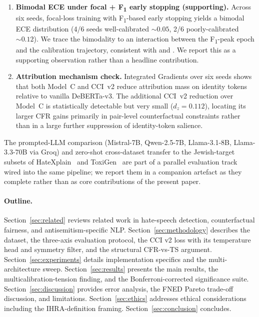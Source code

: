 \begin{enumerate}[leftmargin=*,itemsep=2pt]
    \item \textbf{Bimodal ECE under focal + F\textsubscript{1} early stopping (supporting).} Across six seeds, focal-loss training with F\textsubscript{1}-based early stopping yields a bimodal ECE distribution (4/6 seeds well-calibrated $\sim 0.05$, 2/6 poorly-calibrated $\sim 0.12$). We trace the bimodality to an interaction between the F\textsubscript{1}-peak epoch and the calibration trajectory, consistent with \citet{mukhoti2020calibrating} and \citet{tao2023pcs}. We report this as a supporting observation rather than a headline contribution.
    \item \textbf{Attribution mechanism check.} Integrated Gradients over six seeds shows that both Model~C and CCI~v2 reduce attribution mass on identity tokens relative to vanilla DeBERTa-v3. The additional CCI~v2 reduction over Model~C is statistically detectable but very small ($d_z=0.112$), locating its larger CFR gains primarily in pair-level counterfactual constraints rather than in a large further suppression of identity-token salience.
\end{enumerate}

The prompted-LLM comparison (Mistral-7B, Qwen-2.5-7B, Llama-3.1-8B, Llama-3.3-70B via Groq) and zero-shot cross-dataset transfer to the Jewish-target subsets of HateXplain~\citep{mathew2021hatexplain} and ToxiGen~\citep{hartvigsen2022toxigen} are part of a parallel evaluation track wired into the same pipeline; we report them in a companion artefact as they complete rather than as core contributions of the present paper.

\paragraph{Outline.}
Section~\ref{sec:related} reviews related work in hate-speech detection, counterfactual fairness, and antisemitism-specific NLP. Section~\ref{sec:methodology} describes the dataset, the three-axis evaluation protocol, the CCI v2 loss with its temperature head and symmetry filter, and the structural CFR-vs-TS argument. Section~\ref{sec:experiments} details implementation specifics and the multi-architecture sweep. Section~\ref{sec:results} presents the main results, the multicalibration-tension finding, and the Bonferroni-corrected significance suite. Section~\ref{sec:discussion} provides error analysis, the FNED Pareto trade-off discussion, and limitations. Section~\ref{sec:ethics} addresses ethical considerations including the IHRA-definition framing. Section~\ref{sec:conclusion} concludes.

